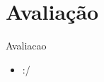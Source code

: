 \section{Avaliação}\label{sec:avaliacao}
\begin{frame}[allowframebreaks]{Avaliacao}
	\begin{itemize}
		\setlength{\itemsep}{0.5em}
		\item :/
	\end{itemize}	
\end{frame}